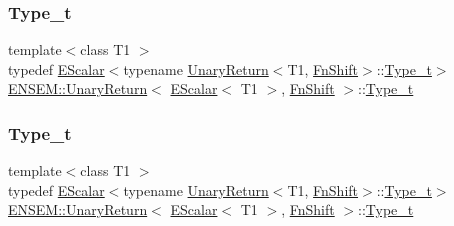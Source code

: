 \subsubsection{\texorpdfstring{Type\_t}{Type\_t}\hspace{0.1cm}{\footnotesize\ttfamily [1/3]}}
{\footnotesize\ttfamily template$<$class T1 $>$ \\
typedef \mbox{\hyperlink{classENSEM_1_1EScalar}{E\+Scalar}}$<$typename \mbox{\hyperlink{structENSEM_1_1UnaryReturn}{Unary\+Return}}$<$T1, \mbox{\hyperlink{structENSEM_1_1FnShift}{Fn\+Shift}}$>$\+::\mbox{\hyperlink{structENSEM_1_1UnaryReturn_3_01EScalar_3_01T1_01_4_00_01FnShift_01_4_a36d8927b4e6f9ea44292d01926dc292a}{Type\+\_\+t}}$>$ \mbox{\hyperlink{structENSEM_1_1UnaryReturn}{E\+N\+S\+E\+M\+::\+Unary\+Return}}$<$ \mbox{\hyperlink{classENSEM_1_1EScalar}{E\+Scalar}}$<$ T1 $>$, \mbox{\hyperlink{structENSEM_1_1FnShift}{Fn\+Shift}} $>$\+::\mbox{\hyperlink{structENSEM_1_1UnaryReturn_3_01EScalar_3_01T1_01_4_00_01FnShift_01_4_a36d8927b4e6f9ea44292d01926dc292a}{Type\+\_\+t}}}

\mbox{\label{structENSEM_1_1UnaryReturn_3_01EScalar_3_01T1_01_4_00_01FnShift_01_4_a36d8927b4e6f9ea44292d01926dc292a}} 
\subsubsection{\texorpdfstring{Type\_t}{Type\_t}\hspace{0.1cm}{\footnotesize\ttfamily [2/3]}}
{\footnotesize\ttfamily template$<$class T1 $>$ \\
typedef \mbox{\hyperlink{classENSEM_1_1EScalar}{E\+Scalar}}$<$typename \mbox{\hyperlink{structENSEM_1_1UnaryReturn}{Unary\+Return}}$<$T1, \mbox{\hyperlink{structENSEM_1_1FnShift}{Fn\+Shift}}$>$\+::\mbox{\hyperlink{structENSEM_1_1UnaryReturn_3_01EScalar_3_01T1_01_4_00_01FnShift_01_4_a36d8927b4e6f9ea44292d01926dc292a}{Type\+\_\+t}}$>$ \mbox{\hyperlink{structENSEM_1_1UnaryReturn}{E\+N\+S\+E\+M\+::\+Unary\+Return}}$<$ \mbox{\hyperlink{classENSEM_1_1EScalar}{E\+Scalar}}$<$ T1 $>$, \mbox{\hyperlink{structENSEM_1_1FnShift}{Fn\+Shift}} $>$\+::\mbox{\hyperlink{structENSEM_1_1UnaryReturn_3_01EScalar_3_01T1_01_4_00_01FnShift_01_4_a36d8927b4e6f9ea44292d01926dc292a}{Type\+\_\+t}}}

